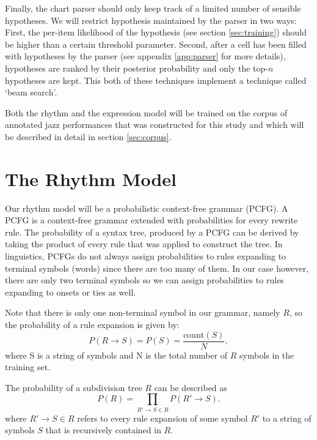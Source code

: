 
Finally, the chart parser should only keep track of a limited number of sensible hypotheses. We will restrict hypothesis maintained by the parser in two ways: First, the per-item likelihood of the hypothesis (see section \ref{sec:training}) should be higher than a certain threshold parameter. Second, after a cell has been filled with hypotheses by the parser (see appendix \ref{app:parser} for more details), hypotheses are ranked by their posterior probability and only the top-$n$ hypotheses are kept. This both of these techniques implement a technique called `beam search'. 

Both the rhythm and the expression model will be trained on the corpus of annotated jazz performances that was constructed for this study and which will be described in detail in section \ref{sec:corpus}.

\section{The Rhythm Model}
\label{sec:prior}

Our rhythm model will be a probabilistic context-free grammar (PCFG). A PCFG is a context-free grammar extended with probabilities for every rewrite rule. The probability of a syntax tree, produced by a PCFG can be derived by taking the product of every rule that was applied to construct the tree. In linguistics, PCFGs do not always assign probabilities to rules expanding to terminal symbols (words) since there are too many of them. In our case however, there are only two terminal symbols so we can assign probabilities to rules expanding to onsets or ties as well.

Note that there is only one non-terminal symbol in our grammar, namely $R$, so the probability of a rule expansion is given by:
\begin{equation}
P(R \rightarrow S) = P(S) = \frac{\mathrm{count}(S)}{N},
\end{equation}
where S is a string of symbols and N is the total number of $R$ symbols in the training set. 

The probability of a subdivision tree $R$ can be described as 
\begin{equation}
P(R) = \prod_{R' \rightarrow S \in R} P(R' \rightarrow S).
\end{equation}
where $R' \rightarrow S \in R$ refers to every rule expansion of some symbol $R'$ to a string of symbols $S$ that is recursively contained in $R$.



